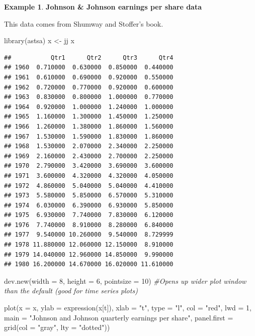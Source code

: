 \documentclass[
]{book}
\newenvironment{Shaded}{\begin{snugshade}}{\end{snugshade}}
\newcommand{\AttributeTok}[1]{\textcolor[rgb]{0.77,0.63,0.00}{#1}}
\newcommand{\CommentTok}[1]{\textcolor[rgb]{0.56,0.35,0.01}{\textit{#1}}}
\newcommand{\DecValTok}[1]{\textcolor[rgb]{0.00,0.00,0.81}{#1}}
\newcommand{\FunctionTok}[1]{\textcolor[rgb]{0.00,0.00,0.00}{#1}}
\newcommand{\NormalTok}[1]{#1}
\newcommand{\OtherTok}[1]{\textcolor[rgb]{0.56,0.35,0.01}{#1}}
\newcommand{\StringTok}[1]{\textcolor[rgb]{0.31,0.60,0.02}{#1}}
\theoremstyle{definition}
\theoremstyle{definition}
\newtheorem{example}{Example}[chapter]
\theoremstyle{definition}
\theoremstyle{definition}
\theoremstyle{remark}
\begin{document}
\begin{example}
\textbf{Johnson \& Johnson earnings per share data}

This data comes from Shumway and Stoffer's book.

\begin{Shaded}
\begin{Highlighting}[]
\FunctionTok{library}\NormalTok{(astsa)}
\NormalTok{x }\OtherTok{\textless{}{-}}\NormalTok{ jj}
\NormalTok{x}
\end{Highlighting}
\end{Shaded}

\begin{verbatim}
##           Qtr1      Qtr2      Qtr3      Qtr4
## 1960  0.710000  0.630000  0.850000  0.440000
## 1961  0.610000  0.690000  0.920000  0.550000
## 1962  0.720000  0.770000  0.920000  0.600000
## 1963  0.830000  0.800000  1.000000  0.770000
## 1964  0.920000  1.000000  1.240000  1.000000
## 1965  1.160000  1.300000  1.450000  1.250000
## 1966  1.260000  1.380000  1.860000  1.560000
## 1967  1.530000  1.590000  1.830000  1.860000
## 1968  1.530000  2.070000  2.340000  2.250000
## 1969  2.160000  2.430000  2.700000  2.250000
## 1970  2.790000  3.420000  3.690000  3.600000
## 1971  3.600000  4.320000  4.320000  4.050000
## 1972  4.860000  5.040000  5.040000  4.410000
## 1973  5.580000  5.850000  6.570000  5.310000
## 1974  6.030000  6.390000  6.930000  5.850000
## 1975  6.930000  7.740000  7.830000  6.120000
## 1976  7.740000  8.910000  8.280000  6.840000
## 1977  9.540000 10.260000  9.540000  8.729999
## 1978 11.880000 12.060000 12.150000  8.910000
## 1979 14.040000 12.960000 14.850000  9.990000
## 1980 16.200000 14.670000 16.020000 11.610000
\end{verbatim}

\begin{Shaded}
\begin{Highlighting}[]
\FunctionTok{dev.new}\NormalTok{(}\AttributeTok{width =} \DecValTok{8}\NormalTok{, }\AttributeTok{height =} \DecValTok{6}\NormalTok{, }\AttributeTok{pointsize =} \DecValTok{10}\NormalTok{)  }\CommentTok{\#Opens up wider plot window than the default (good for time series plots)}

\FunctionTok{plot}\NormalTok{(}\AttributeTok{x =}\NormalTok{ x, }\AttributeTok{ylab =} \FunctionTok{expression}\NormalTok{(x[t]), }\AttributeTok{xlab =} \StringTok{"t"}\NormalTok{, }\AttributeTok{type =} 
    \StringTok{"l"}\NormalTok{, }\AttributeTok{col =} \StringTok{"red"}\NormalTok{, }\AttributeTok{lwd =} \DecValTok{1}\NormalTok{, }\AttributeTok{main =} \StringTok{"Johnson and Johnson }
\StringTok{    quarterly earnings per share"}\NormalTok{, }\AttributeTok{panel.first =} \FunctionTok{grid}\NormalTok{(}\AttributeTok{col =} 
    \StringTok{"gray"}\NormalTok{, }\AttributeTok{lty =} \StringTok{"dotted"}\NormalTok{))}
    

\end{Highlighting}
\end{Shaded}
\end{example}
\end{document}
